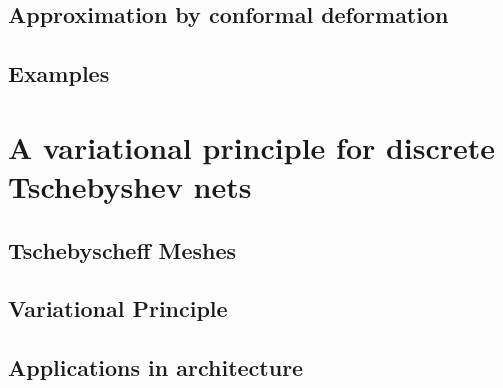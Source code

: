 \documentclass{book}
\begin{document}
\subsection{Approximation by conformal deformation}
\subsection{Examples}

\section{A variational principle for discrete Tschebyshev nets}
\subsection{Tschebyscheff Meshes}
\subsection{Variational Principle}
\subsection{Applications in architecture}

\newpage
\backmatter 

\setcounter{secnumdepth}{-1} 

\end{document}
